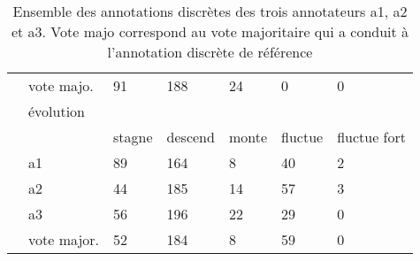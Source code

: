 \begin{table}[]
\begin{tabular}{|l|l|l|l|l|l|l|}
                                      & vote majo. & 91     & 188     & 24        & 0            & 0                 \\ \cline{2-7}
                                      & \multicolumn{6}{l|}{évolution}                                                     \\ \cline{2-7}
                                      &                  & stagne & descend & monte     & fluctue      & fluctue fort \\ \cline{2-7}
                                      & a1               & 89     & 164     & 8         & 40           & 2                 \\ \cline{2-7}
                                      & a2               & 44     & 185     & 14        & 57           & 3                 \\ \cline{2-7}
                                      & a3               & 56     & 196     & 22        & 29           & 0                 \\ \cline{2-7}
                                      & vote major. & 52     & 184     & 8         & 59           & 0                 \\ \hline
\end{tabular}
\label{tab:statistiqueAnnotation}
\caption{Ensemble des annotations discrètes des trois annotateurs a1, a2 et a3. Vote majo correspond au vote majoritaire qui a conduit à l'annotation discrète de référence}
\end{table}
